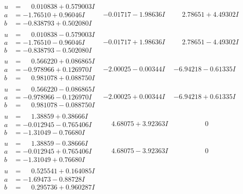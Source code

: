\documentclass[1p]{elsarticle_modified}
\theoremstyle{definition}
\begin{document}
$$\begin{array}{c|c|c}
\begin{aligned}
u &= \phantom{-}0.010838 + 0.579003 I \\
a &= -1.76510 + 0.96046 I \\
b &= -0.838793 + 0.502080 I\end{aligned}
 & -0.01717 - 1.98636 I & \phantom{-}2.78651 + 4.49302 I \\ \hline\begin{aligned}
u &= \phantom{-}0.010838 - 0.579003 I \\
a &= -1.76510 - 0.96046 I \\
b &= -0.838793 - 0.502080 I\end{aligned}
 & -0.01717 + 1.98636 I & \phantom{-}2.78651 - 4.49302 I \\ \hline\begin{aligned}
u &= \phantom{-}0.566220 + 0.086865 I \\
a &= -0.978966 + 0.126970 I \\
b &= \phantom{-}0.981078 + 0.088750 I\end{aligned}
 & -2.00025 - 0.00344 I & -6.94218 - 0.61335 I \\ \hline\begin{aligned}
u &= \phantom{-}0.566220 - 0.086865 I \\
a &= -0.978966 - 0.126970 I \\
b &= \phantom{-}0.981078 - 0.088750 I\end{aligned}
 & -2.00025 + 0.00344 I & -6.94218 + 0.61335 I \\ \hline\begin{aligned}
u &= \phantom{-}1.38859 + 0.38666 I \\
a &= -0.012945 - 0.765406 I \\
b &= -1.31049 - 0.76680 I\end{aligned}
 & \phantom{-}4.68075 + 3.92363 I & \phantom{-0.000000 } 0 \\ \hline\begin{aligned}
u &= \phantom{-}1.38859 - 0.38666 I \\
a &= -0.012945 + 0.765406 I \\
b &= -1.31049 + 0.76680 I\end{aligned}
 & \phantom{-}4.68075 - 3.92363 I & \phantom{-0.000000 } 0 \\ \hline\begin{aligned}
u &= \phantom{-}0.525541 + 0.164085 I \\
a &= -1.69473 - 0.88728 I \\
b &= \phantom{-}0.295736 + 0.960287 I\end{aligned}

\end{array}$$
\end{document}
